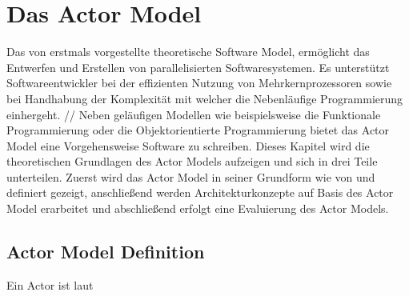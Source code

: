 \chapter{Das Actor Model}
Das von \cite{hewitt1973session} erstmals vorgestellte theoretische Software Model, ermöglicht das Entwerfen und Erstellen von parallelisierten Softwaresystemen. Es unterstützt Softwareentwickler bei der effizienten Nutzung von Mehrkernprozessoren sowie bei Handhabung der  Komplexität mit welcher die Nebenläufige Programmierung einhergeht.   //
Neben geläufigen Modellen wie beispielsweise die Funktionale Programmierung oder die Objektorientierte Programmierung bietet das Actor Model eine Vorgehensweise Software zu schreiben. Dieses Kapitel wird die theoretischen Grundlagen des Actor Models aufzeigen und sich in drei Teile unterteilen. Zuerst wird das Actor Model in seiner Grundform wie von \cite{hewitt1973session} und \cite{Agha1985ActorsSystems} definiert gezeigt, anschließend werden Architekturkonzepte auf Basis des Actor Model erarbeitet und abschließend erfolgt eine Evaluierung des Actor Models.

\section{Actor Model Definition}
Ein Actor ist laut \cite{hewitt1973session}
